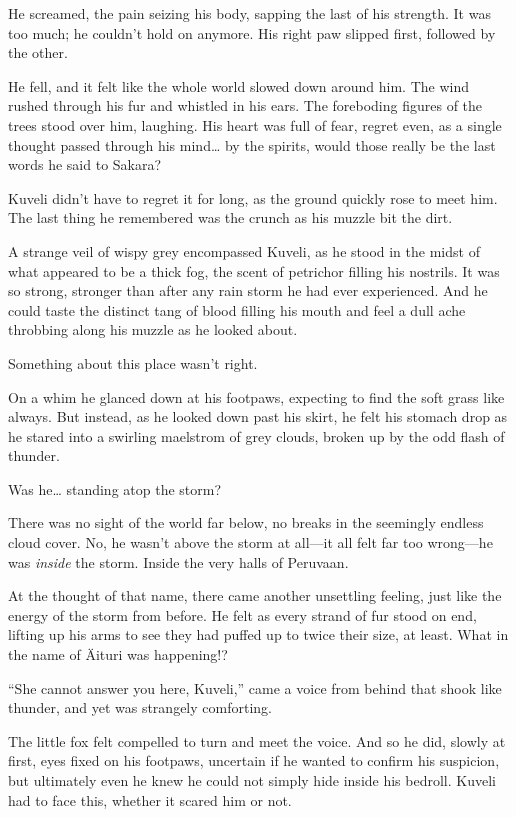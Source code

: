 He screamed, the pain seizing his body, sapping the last of his strength. It was too much; he couldn't hold on anymore. His right paw slipped first, followed by the other.

He fell, and it felt like the whole world slowed down around him. The wind rushed through his fur and whistled in his ears. The foreboding figures of the trees stood over him, laughing. His heart was full of fear, regret even, as a single thought passed through his mind\ldots{} by the spirits, would those really be the last words he said to Sakara?

Kuveli didn't have to regret it for long, as the ground quickly rose to meet him. The last thing he remembered was the crunch as his muzzle bit the dirt.

\secdiv

\noindent A strange veil of wispy grey encompassed Kuveli, as he stood in the midst of what appeared to be a thick fog, the scent of petrichor filling his nostrils. It was so strong, stronger than after any rain storm he had ever experienced. And he could taste the distinct tang of blood filling his mouth and feel a dull ache throbbing along his muzzle as he looked about.

Something about this place wasn't right.

On a whim he glanced down at his footpaws, expecting to find the soft grass like always. But instead, as he looked down past his skirt, he felt his stomach drop as he stared into a swirling maelstrom of grey clouds, broken up by the odd flash of thunder.

Was he\ldots{} standing atop the storm?

There was no sight of the world far below, no breaks in the seemingly endless cloud cover. No, he wasn't above the storm at all---it all felt far too wrong---he was \emph{inside} the storm. Inside the very halls of Peruvaan.

At the thought of that name, there came another unsettling feeling, just like the energy of the storm from before. He felt as every strand of fur stood on end, lifting up his arms to see they had puffed up to twice their size, at least. What in the name of Äituri was happening!?

``She cannot answer you here, Kuveli,'' came a voice from behind that shook like thunder, and yet was strangely comforting.

The little fox felt compelled to turn and meet the voice. And so he did, slowly at first, eyes fixed on his footpaws, uncertain if he wanted to confirm his suspicion, but ultimately even he knew he could not simply hide inside his bedroll. Kuveli had to face this, whether it scared him or not.

